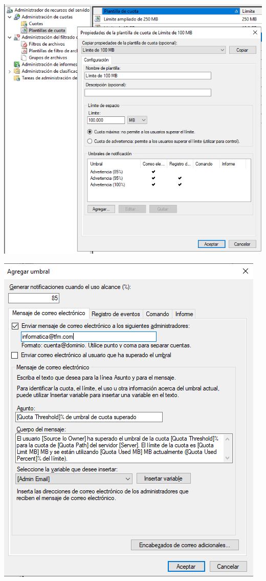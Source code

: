 \documentclass[
  a4paper,
]{article}
\begin{document}
\includegraphics{png/Cuota3.png}

\includegraphics{png/Cuota4.png}
\end{document}
